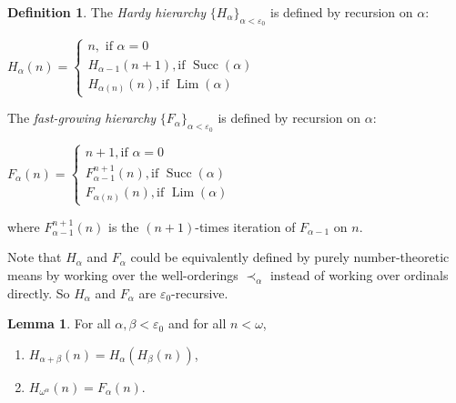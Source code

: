 \documentclass[8pt]{article}
\theoremstyle{definition}
\newtheorem{definition}{Definition}[section]
\theoremstyle{definition}
\theoremstyle{definition}
\theoremstyle{definition}
\theoremstyle{definition}
\theoremstyle{definition}
\theoremstyle{definition}
\theoremstyle{definition}
\newtheorem{lemma}{Lemma}[section]
\theoremstyle{definition}
\theoremstyle{definition}
\theoremstyle{definition}
\theoremstyle{definition}
\theoremstyle{definition}
\theoremstyle{question}
\begin{document}
\begin{definition}
  The \emph{Hardy hierarchy} $\{ H_{\alpha}\}_{\alpha < \varepsilon_0}$ is defined by recursion on $\alpha$:

  \begin{center}
    $H_{\alpha}(n) = \begin{cases}
      n, \text{ if $\alpha = 0 $} \\
      H_{\alpha - 1}(n + 1), \text{if $\operatorname{Succ}(\alpha)$} \\
      H_{\alpha(n)}(n), \text{if $\operatorname{Lim}(\alpha)$}
    \end{cases}$
  \end{center}

  The \emph{fast-growing hierarchy} $\{ F_{\alpha} \}_{\alpha < \varepsilon_0}$ is defined by recursion on $\alpha$:

  \begin{center}
    $F_{\alpha}(n) = \begin{cases}
      n + 1, \text{if $\alpha = 0$} \\
      F^{n + 1}_{\alpha - 1}(n), \text{if $\operatorname{Succ}(\alpha)$} \\
      F_{\alpha(n)}(n), \text{if $\operatorname{Lim}(\alpha)$}
    \end{cases}$
  \end{center}
  where $F^{n + 1}_{\alpha - 1}(n)$ is the $(n + 1)$-times iteration of $F_{\alpha - 1}$ on $n$.
\end{definition}

Note that $H_{\alpha}$ and $F_{\alpha}$ could be equivalently defined by purely number-theoretic means
by working over the well-orderings $\prec_{\alpha}$ instead of working over ordinals directly. So $H_{\alpha}$ and
$F_{\alpha}$ are $\varepsilon_0$-recursive.

\begin{lemma}
  For all $\alpha, \beta < \varepsilon_0$ and for all $n < \omega$,

  \begin{enumerate}
    \item $H_{\alpha + \beta}(n) = H_{\alpha}(H_{\beta}(n))$,
    \item $H_{\omega^{\alpha}}(n) = F_{\alpha}(n)$.
  \end{enumerate}
\end{lemma}
\end{document}
